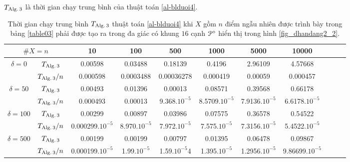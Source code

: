 \documentclass[12pt,a4paper,openany,oneside]{report}
\begin{document}
$T_{\rm Alg.\, 3}$ là thời gian chạy trung bình của thuật toán \ref{al-blduoi4}.

\begin{table}[ht]
	\begin{center}\renewcommand{\arraystretch}{1.2}\small
		\setlength\tabcolsep{0.05cm}
		\begin{tabular}{|c|c||c|c|c|c|c|c|c|c|c|}
			\hline
			\multicolumn {2}{|c||}{\footnotesize $\#X=n$}  & 10& 100& 500& 1000&5000&10000 \\ 
			\hline		
			\hline
			{ $\delta = 0$}
			
			& $T_{\rm Alg.\, 3}$  &   0.00598&  0.03488& 0.18139& 0.4196& 2.96109& 4.57668 \\
			
			& $T_{\rm Alg.\, 3}/n$&0.000598 &  0.0003488 & 0.00036278&0.000419& 0.00059& 0.000457  \\
			\hline
			{ $\delta = 50$}
			
			& $T_{\rm Alg.\, 3}$  &   0.00493&0.01396& 0.00013& 0.08571& 0.39568&0.66178 \\
			
			& $T_{\rm Alg.\, 3}/n$&0.000493&0.00013& 9.368.$10^{-5}$& 8.5709.$10^{-5}$& 7.9136.$10^{-5}$& 6.6178.$10^{-5}$  \\
			\hline
			{ $\delta = 100$}
			
			& $T_{\rm Alg.\, 3}$  &0.00299 & 0.00897&0.03986& 0.07575& 0.36578 &0.54522\\
			
			& $T_{\rm Alg.\, 3}/n$& 0.000299.$10^{-5}$& 8.970.$10^{-5}$&7.972.$10^{-5}$& 7.575.$10^{-5}$&7.3156.$10^{-5}$  &5.4522.$10^{-5}$\\
			\hline
			{ $\delta = 500$}
			
			& $T_{\rm Alg.\, 3}$  &    0.00199& 0.00199&0.00797 &0.01395&0.06478& 0.09867 \\
			
			& $T_{\rm Alg.\, 3}/n$&0.000199.$10^{-5}$ &1.99.$10^{-5}$&1.59.$10^{-5}$4& 1.395.$10^{-5}$&1.2956.$10^{-5}$&9.86699.$10^{-5}$\\
			\hline
		\end{tabular}
		\caption{Thời gian chạy trung bình $T_{\rm Alg.\,3}$  thuật toán \ref{al-blduoi4} khi $X$ gồm $n$ điểm ngẫu nhiên được trình bày trong bảng \ref{table03} phải được tạo ra trong đa giác có khung $16$ cạnh  ${\cal P}^\diamond$ hiển thị trong hình \ref{fig_dhandang2_2}.}
		\label{table04}
	\end{center}
\end{table} 	
\end{document}
